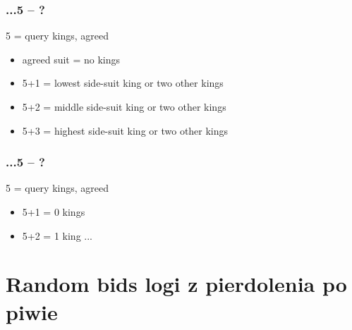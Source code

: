 \documentclass[12pt, a4paper]{article}
\begin{document}
\subsubsection*{...5 -- ?}
5 = query kings, \major agreed
\begin{itemize}
    \item agreed suit = no kings
    \item 5+1 = lowest side-suit king or two other kings
    \item 5+2 = middle side-suit king or two other kings
    \item 5+3 = highest side-suit king or two other kings
\end{itemize}

\subsubsection*{...5 -- ?}
5 = query kings, \minor agreed
\begin{itemize}
    \item 5+1 = 0 kings
    \item 5+2 = 1 king
    ...
\end{itemize}



\section{Random bids {\color{anti-flashwhite}logi z pierdolenia po piwie}}
\end{document}
